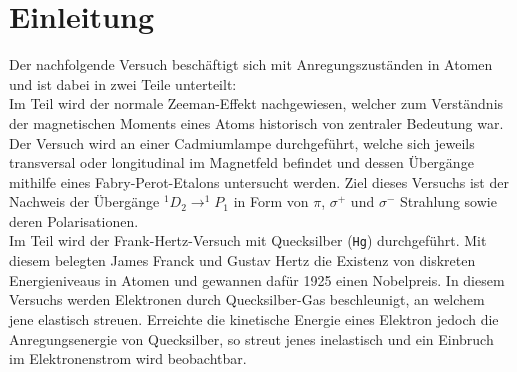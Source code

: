\section{Einleitung}
    Der nachfolgende Versuch beschäftigt sich mit Anregungszuständen in Atomen und ist dabei in zwei Teile unterteilt: \\
    
    Im Teil  wird der normale Zeeman-Effekt nachgewiesen, welcher zum Verständnis der magnetischen Moments eines Atoms historisch von zentraler Bedeutung war. Der Versuch wird an einer Cadmiumlampe durchgeführt, welche sich jeweils transversal oder longitudinal im Magnetfeld befindet und dessen Übergänge mithilfe eines Fabry-Perot-Etalons untersucht werden. Ziel dieses Versuchs ist der Nachweis der Übergänge $^1 D_2 \rightarrow ^1 P_1$  in Form von $\pi$, $\sigma^+$ und $\sigma^-$ Strahlung sowie deren Polarisationen.  \\
    
    Im Teil  wird der Frank-Hertz-Versuch mit Quecksilber (\texttt{Hg}) durchgeführt. Mit diesem belegten James Franck und Gustav Hertz die Existenz von diskreten Energieniveaus in Atomen und gewannen dafür 1925 einen Nobelpreis. In diesem Versuchs werden Elektronen durch Quecksilber-Gas beschleunigt, an welchem jene elastisch streuen. Erreichte die kinetische Energie eines Elektron jedoch die Anregungsenergie von Quecksilber, so streut jenes inelastisch und ein Einbruch im Elektronenstrom wird beobachtbar. \cite{P401_Praktikumsanleitung}
    